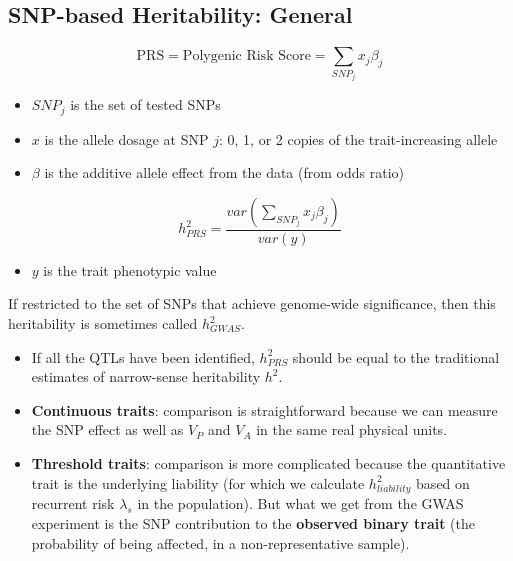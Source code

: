 \documentclass[10pt]{article}
\begin{document}
\subsection*{SNP-based Heritability: General}
\[\text{PRS} = \text{Polygenic Risk Score} = \sum_{SNP_j} x_j \beta_j\]
\begin{itemize}
	\item $SNP_j$ is the set of tested SNPs
	\item $x$ is the allele dosage at SNP $j$: 0, 1, or 2 copies of the trait-increasing allele
	\item $\beta$ is the additive allele effect from the data (from odds ratio)
\end{itemize}
\[h_{PRS}^2 = \frac{var\left(\sum_{SNP_j} x_j \beta_j\right)}{var(y)}\]
\begin{itemize}
	\item $y$ is the trait phenotypic value
\end{itemize}
If restricted to the set of SNPs that achieve genome-wide significance, then this heritability is sometimes called $h_{GWAS}^2$.
\begin{itemize}
	\item If all the QTLs have been identified, $h_{PRS}^2$ should be equal to the traditional estimates of narrow-sense heritability $h^2$.
	\item \textbf{Continuous traits}: comparison is straightforward because we can measure the SNP effect as well as $V_P$ and $V_A$ in the same real physical units.
	\item \textbf{Threshold traits}: comparison is more complicated because the quantitative trait is the underlying liability (for which we calculate $h_{liability}^2$ based on recurrent risk $\lambda_s$ in the population).  But what we get from the GWAS experiment is the SNP contribution to the \textbf{observed binary trait} (the probability of being affected, in a non-representative sample).
\end{itemize}
\end{document}
